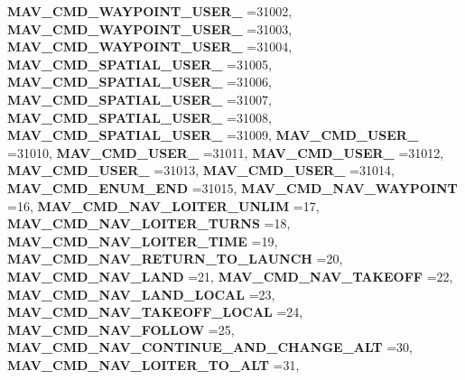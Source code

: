 \begin{DoxyCompactItemize}
\textbf{ M\+A\+V\+\_\+\+C\+M\+D\+\_\+\+W\+A\+Y\+P\+O\+I\+N\+T\+\_\+\+U\+S\+E\+R\+\_} =31002, 
\textbf{ M\+A\+V\+\_\+\+C\+M\+D\+\_\+\+W\+A\+Y\+P\+O\+I\+N\+T\+\_\+\+U\+S\+E\+R\+\_} =31003, 
\newline
\textbf{ M\+A\+V\+\_\+\+C\+M\+D\+\_\+\+W\+A\+Y\+P\+O\+I\+N\+T\+\_\+\+U\+S\+E\+R\+\_} =31004, 
\textbf{ M\+A\+V\+\_\+\+C\+M\+D\+\_\+\+S\+P\+A\+T\+I\+A\+L\+\_\+\+U\+S\+E\+R\+\_} =31005, 
\textbf{ M\+A\+V\+\_\+\+C\+M\+D\+\_\+\+S\+P\+A\+T\+I\+A\+L\+\_\+\+U\+S\+E\+R\+\_} =31006, 
\textbf{ M\+A\+V\+\_\+\+C\+M\+D\+\_\+\+S\+P\+A\+T\+I\+A\+L\+\_\+\+U\+S\+E\+R\+\_} =31007, 
\newline
\textbf{ M\+A\+V\+\_\+\+C\+M\+D\+\_\+\+S\+P\+A\+T\+I\+A\+L\+\_\+\+U\+S\+E\+R\+\_} =31008, 
\textbf{ M\+A\+V\+\_\+\+C\+M\+D\+\_\+\+S\+P\+A\+T\+I\+A\+L\+\_\+\+U\+S\+E\+R\+\_} =31009, 
\textbf{ M\+A\+V\+\_\+\+C\+M\+D\+\_\+\+U\+S\+E\+R\+\_} =31010, 
\textbf{ M\+A\+V\+\_\+\+C\+M\+D\+\_\+\+U\+S\+E\+R\+\_} =31011, 
\newline
\textbf{ M\+A\+V\+\_\+\+C\+M\+D\+\_\+\+U\+S\+E\+R\+\_} =31012, 
\textbf{ M\+A\+V\+\_\+\+C\+M\+D\+\_\+\+U\+S\+E\+R\+\_} =31013, 
\textbf{ M\+A\+V\+\_\+\+C\+M\+D\+\_\+\+U\+S\+E\+R\+\_} =31014, 
\textbf{ M\+A\+V\+\_\+\+C\+M\+D\+\_\+\+E\+N\+U\+M\+\_\+\+E\+ND} =31015, 
\newline
\textbf{ M\+A\+V\+\_\+\+C\+M\+D\+\_\+\+N\+A\+V\+\_\+\+W\+A\+Y\+P\+O\+I\+NT} =16, 
\textbf{ M\+A\+V\+\_\+\+C\+M\+D\+\_\+\+N\+A\+V\+\_\+\+L\+O\+I\+T\+E\+R\+\_\+\+U\+N\+L\+IM} =17, 
\textbf{ M\+A\+V\+\_\+\+C\+M\+D\+\_\+\+N\+A\+V\+\_\+\+L\+O\+I\+T\+E\+R\+\_\+\+T\+U\+R\+NS} =18, 
\textbf{ M\+A\+V\+\_\+\+C\+M\+D\+\_\+\+N\+A\+V\+\_\+\+L\+O\+I\+T\+E\+R\+\_\+\+T\+I\+ME} =19, 
\newline
\textbf{ M\+A\+V\+\_\+\+C\+M\+D\+\_\+\+N\+A\+V\+\_\+\+R\+E\+T\+U\+R\+N\+\_\+\+T\+O\+\_\+\+L\+A\+U\+N\+CH} =20, 
\textbf{ M\+A\+V\+\_\+\+C\+M\+D\+\_\+\+N\+A\+V\+\_\+\+L\+A\+ND} =21, 
\textbf{ M\+A\+V\+\_\+\+C\+M\+D\+\_\+\+N\+A\+V\+\_\+\+T\+A\+K\+E\+O\+FF} =22, 
\textbf{ M\+A\+V\+\_\+\+C\+M\+D\+\_\+\+N\+A\+V\+\_\+\+L\+A\+N\+D\+\_\+\+L\+O\+C\+AL} =23, 
\newline
\textbf{ M\+A\+V\+\_\+\+C\+M\+D\+\_\+\+N\+A\+V\+\_\+\+T\+A\+K\+E\+O\+F\+F\+\_\+\+L\+O\+C\+AL} =24, 
\textbf{ M\+A\+V\+\_\+\+C\+M\+D\+\_\+\+N\+A\+V\+\_\+\+F\+O\+L\+L\+OW} =25, 
\textbf{ M\+A\+V\+\_\+\+C\+M\+D\+\_\+\+N\+A\+V\+\_\+\+C\+O\+N\+T\+I\+N\+U\+E\+\_\+\+A\+N\+D\+\_\+\+C\+H\+A\+N\+G\+E\+\_\+\+A\+LT} =30, 
\textbf{ M\+A\+V\+\_\+\+C\+M\+D\+\_\+\+N\+A\+V\+\_\+\+L\+O\+I\+T\+E\+R\+\_\+\+T\+O\+\_\+\+A\+LT} =31, 

\end{DoxyCompactItemize}
